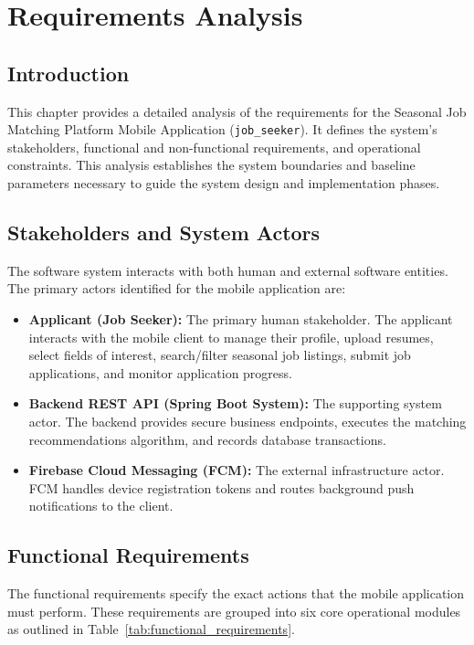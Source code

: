 \chapter{Requirements Analysis}
\label{ch:requirements_analysis}

\section{Introduction}
This chapter provides a detailed analysis of the requirements for the Seasonal Job Matching Platform Mobile Application (\texttt{job\_seeker}). It defines the system's stakeholders, functional and non-functional requirements, and operational constraints. This analysis establishes the system boundaries and baseline parameters necessary to guide the system design and implementation phases.

\section{Stakeholders and System Actors}
The software system interacts with both human and external software entities. The primary actors identified for the mobile application are:

\begin{itemize}
    \item \textbf{Applicant (Job Seeker):} The primary human stakeholder. The applicant interacts with the mobile client to manage their profile, upload resumes, select fields of interest, search/filter seasonal job listings, submit job applications, and monitor application progress.
    \item \textbf{Backend REST API (Spring Boot System):} The supporting system actor. The backend provides secure business endpoints, executes the matching recommendations algorithm, and records database transactions.
    \item \textbf{Firebase Cloud Messaging (FCM):} The external infrastructure actor. FCM handles device registration tokens and routes background push notifications to the client.
\end{itemize}

\section{Functional Requirements}
The functional requirements specify the exact actions that the mobile application must perform. These requirements are grouped into six core operational modules as outlined in Table~\ref{tab:functional_requirements}.

